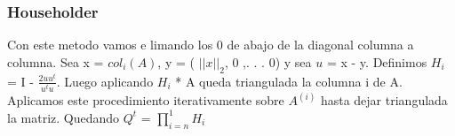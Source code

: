 \subsubsection{Householder}

Con este metodo vamos e limando los 0 de abajo de la diagonal columna a columna.
Sea x = $col_i(A)$, y = ( $||x||_2$, 0 ,. . . 0) y sea $u$ = x - y. Definimos $H_i$ = I -  $ \frac{2uu^t}{u^tu} $.
Luego aplicando $H_i$ * A queda triangulada la columna i de A. Aplicamos este procedimiento iterativamente sobre $A^{(i)}$ hasta dejar triangulada la matriz. 
Quedando $Q^t$ =  $\prod_{i = n}^1 H_i $


